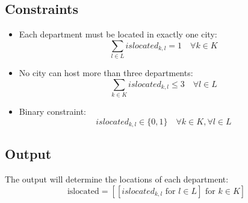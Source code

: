 \documentclass{article}
\begin{document}
\subsection*{Constraints}
\begin{itemize}
    \item Each department must be located in exactly one city:
    \[
    \sum_{l \in L} islocated_{k,l} = 1 \quad \forall k \in K
    \]
    
    \item No city can host more than three departments:
    \[
    \sum_{k \in K} islocated_{k,l} \leq 3 \quad \forall l \in L
    \]

    \item Binary constraint:
    \[
    islocated_{k,l} \in \{0, 1\} \quad \forall k \in K, \forall l \in L
    \]
\end{itemize}

\subsection*{Output}
The output will determine the locations of each department:
\[
\text{islocated} = \left[ \left[ islocated_{k,l} \text{ for } l \in L \right] \text{ for } k \in K \right]
\]
\end{document}
